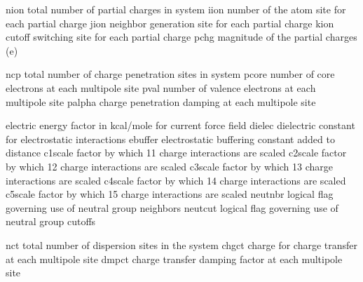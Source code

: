 \documentclass[letterpaper,11pt,english]{sphinxmanual}
\begin{document}

\begin{sphinxVerbatim}[commandchars=\\\{\}]
nion            total number of partial charges in system
iion            number of the atom site for each partial charge
jion            neighbor generation site for each partial charge
kion            cutoff switching site for each partial charge
pchg            magnitude of the partial charges (e\PYGZhy{})
\end{sphinxVerbatim}


\begin{sphinxVerbatim}[commandchars=\\\{\}]
ncp             total number of charge penetration sites in system
pcore           number of core electrons at each multipole site
pval            number of valence electrons at each multipole site
palpha          charge penetration damping at each multipole site
\end{sphinxVerbatim}


\begin{sphinxVerbatim}[commandchars=\\\{\}]
electric        energy factor in kcal/mole for current force field
dielec          dielectric constant for electrostatic interactions
ebuffer         electrostatic buffering constant added to distance
c1scale         factor by which 1\PYGZhy{}1 charge interactions are scaled
c2scale         factor by which 1\PYGZhy{}2 charge interactions are scaled
c3scale         factor by which 1\PYGZhy{}3 charge interactions are scaled
c4scale         factor by which 1\PYGZhy{}4 charge interactions are scaled
c5scale         factor by which 1\PYGZhy{}5 charge interactions are scaled
neutnbr         logical flag governing use of neutral group neighbors
neutcut         logical flag governing use of neutral group cutoffs
\end{sphinxVerbatim}


\begin{sphinxVerbatim}[commandchars=\\\{\}]
nct             total number of dispersion sites in the system
chgct           charge for charge transfer at each multipole site
dmpct           charge transfer damping factor at each multipole site
\end{sphinxVerbatim}
\end{document}
